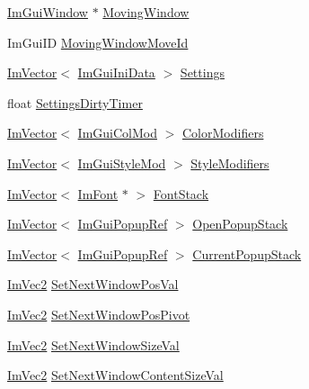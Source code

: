 \begin{DoxyCompactItemize}
\item 
\hyperlink{struct_im_gui_window}{Im\+Gui\+Window} $\ast$ \hyperlink{struct_im_gui_context_a28078cc22f615213fd8544016cd6ae20}{Moving\+Window}
\item 
Im\+Gui\+ID \hyperlink{struct_im_gui_context_abfd9589ba8b4d6b78bd24d46696ed820}{Moving\+Window\+Move\+Id}
\item 
\hyperlink{class_im_vector}{Im\+Vector}$<$ \hyperlink{struct_im_gui_ini_data}{Im\+Gui\+Ini\+Data} $>$ \hyperlink{struct_im_gui_context_ad7786303f4a54b3dc702e4e646a10bad}{Settings}
\item 
float \hyperlink{struct_im_gui_context_a7e0dd3aef4a4f0fd85ed39e13824f2ab}{Settings\+Dirty\+Timer}
\item 
\hyperlink{class_im_vector}{Im\+Vector}$<$ \hyperlink{struct_im_gui_col_mod}{Im\+Gui\+Col\+Mod} $>$ \hyperlink{struct_im_gui_context_aeb58091b545cc794c99487b8e66daf43}{Color\+Modifiers}
\item 
\hyperlink{class_im_vector}{Im\+Vector}$<$ \hyperlink{struct_im_gui_style_mod}{Im\+Gui\+Style\+Mod} $>$ \hyperlink{struct_im_gui_context_ac0feba14c36c7dff87211c3650815be7}{Style\+Modifiers}
\item 
\hyperlink{class_im_vector}{Im\+Vector}$<$ \hyperlink{struct_im_font}{Im\+Font} $\ast$ $>$ \hyperlink{struct_im_gui_context_a8a6a9f23604fe0d0b51c78e45e4432b0}{Font\+Stack}
\item 
\hyperlink{class_im_vector}{Im\+Vector}$<$ \hyperlink{struct_im_gui_popup_ref}{Im\+Gui\+Popup\+Ref} $>$ \hyperlink{struct_im_gui_context_af6c0e07cff9641d31bdf22b7e7df2842}{Open\+Popup\+Stack}
\item 
\hyperlink{class_im_vector}{Im\+Vector}$<$ \hyperlink{struct_im_gui_popup_ref}{Im\+Gui\+Popup\+Ref} $>$ \hyperlink{struct_im_gui_context_a7b2472ca52bcccb98e0db1a8b1b78853}{Current\+Popup\+Stack}
\item 
\hyperlink{struct_im_vec2}{Im\+Vec2} \hyperlink{struct_im_gui_context_a8cb5445e4f740af210aa1794707dffbc}{Set\+Next\+Window\+Pos\+Val}
\item 
\hyperlink{struct_im_vec2}{Im\+Vec2} \hyperlink{struct_im_gui_context_a0da8611453fefe211a63abce142f9d74}{Set\+Next\+Window\+Pos\+Pivot}
\item 
\hyperlink{struct_im_vec2}{Im\+Vec2} \hyperlink{struct_im_gui_context_a80a09eeab06dd8abaa79cc5d26998af4}{Set\+Next\+Window\+Size\+Val}
\item 
\hyperlink{struct_im_vec2}{Im\+Vec2} \hyperlink{struct_im_gui_context_aa861c8e8d3b52e2fe8b581a4a132c39b}{Set\+Next\+Window\+Content\+Size\+Val}

\end{DoxyCompactItemize}
